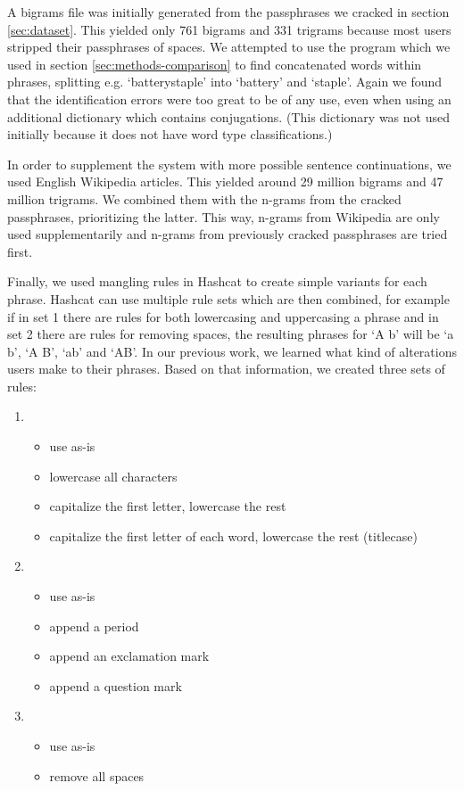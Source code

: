 \documentclass{article}
\begin{document}
A bigrams file was initially generated from the passphrases we cracked in
section \ref{sec:dataset}. This yielded only 761 bigrams and 331 trigrams
because most users stripped their passphrases of spaces. We attempted to use
the program which we used in section \ref{sec:methods-comparison} to find
concatenated words within phrases, splitting e.g. `batterystaple' into
`battery' and `staple'. Again we found that the identification errors were too
great to be of any use, even when using an additional
dictionary\cite{wamerican} which contains conjugations. (This dictionary was
not used initially because it does not have word type classifications.)

In order to supplement the system with more possible sentence continuations, we
used English Wikipedia articles. This yielded around 29 million bigrams and 47
million trigrams. We combined them with the n-grams from the cracked
passphrases, prioritizing the latter. This way, n-grams from Wikipedia are only
used supplementarily and n-grams from previously cracked passphrases are
tried first.

Finally, we used mangling rules in Hashcat to create simple variants for each
phrase. Hashcat can use multiple rule sets which are then combined, for example
if in set 1 there are rules for both lowercasing and uppercasing a phrase and
in set 2 there are rules for removing spaces, the resulting phrases for `A b'
will be `a b', `A B', `ab' and `AB'. In our previous work, we learned what kind
of alterations users make to their phrases. Based on that information, we
created three sets of rules:

\begin{enumerate}
	\item \begin{itemize}
		\item use as-is
		\item lowercase all characters
		\item capitalize the first letter, lowercase the rest
		\item capitalize the first letter of each word, lowercase the rest (titlecase)
	\end{itemize}

	\item \begin{itemize}
		\item use as-is
		\item append a period
		\item append an exclamation mark
		\item append a question mark
	\end{itemize}

	\item \begin{itemize}
		\item use as-is
		\item remove all spaces
	\end{itemize}
\end{enumerate}
\end{document}
